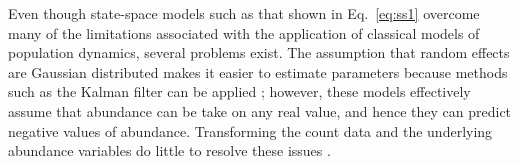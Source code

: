 \documentclass[12pt,english]{article}
\begin{document}
\begin{spacing}{1.9}
\begin{flushleft}
Even though state-space models such as that shown in Eq.~\ref{eq:ss1}
overcome many of the limitations associated with the application of
classical models of population dynamics, 
several problems exist. %
The assumption that random effects are Gaussian distributed makes it
easier to estimate parameters because methods such as the Kalman
filter can be applied %
\citep{dennis_etal:2006}; however, %
these models effectively assume that abundance can be take on any
real value, and hence they can predict negative values of abundance. %
Transforming the count data and the underlying abundance variables 
do little to resolve these issues \citep{ohara_kotze:2010}.


\end{flushleft}
\end{spacing}
\end{document}
